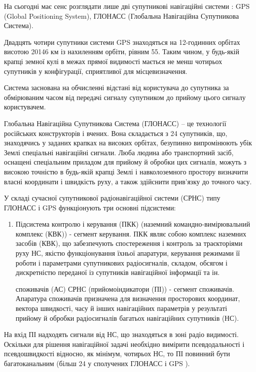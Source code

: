 На сьогодні має сенс розглядати лише дві супутникові навігаційні системи : GPS (Global Positioning System), 
ГЛОНАСС (Глобальна Навігаційна Супутникова Система).

Двадцять чотири супутники системи GPS знаходяться на 12-годинних орбітах висотою 
20146 км із нахиленням орбіти, рівним 55. Таким чином, 
у будь-якій крапці земної кулі в межах прямої видимості мається не менш чотирьох супутників 
у конфігурації, сприятливої для місцевизначення.

Система заснована на обчисленні відстані від користувача до супутника за обмірюваним часом 
від передачі сигналу супутником до прийому цього сигналу користувачем.

Глобальна Навігаційна Супутникова Система (ГЛОНАСС) -- це технології російських конструкторів і вчених.
Вона складається 
з 24 супутників, що, знаходячись у заданих крапках на високих орбітах, безупинно випромінюють 
убік Землі спеціальні навігаційні сигнали. Люба людина або транспортний засіб, оснащені 
спеціальним приладом для прийому й обробки цих сигналів, можуть з високою точністю в 
будь-якій крапці Землі і навколоземного простору визначити власні координати і швидкість 
руху, а також здійснити прив'язку до точного часу.

У складі сучасної супутникової радіонавігаційної системи (СРНС) типу ГЛОНАСС і 
GPS функціонують три основні підсистеми:

\begin{enumerate}

 космічних апаратів (ПКА), що складається з навігаційних супутників (НС) 
(мережа навігаційних супутників - космічний сегмент). ПКА СРНС складається з визначеного 
числа навігаційних супутників. Основні функції НС --- формування і випромінювання 
радіосигналів, необхідних для навігаційних визначень споживачів СРНС, контролю бортових 
систем супутника підсистемою контролю і керування СРНС. Відповідні характеристики сигналів 
НС і способи їхньої обробки дозволяють проводити навігаційні виміри з високою точністю.

 \item Підсистема контролю і керування (ПКК) (наземний командно-вимірювальний комплекс (КВК)) - 
сегмент керування. ПКК являє собою комплекс наземних засобів (КВК), що забезпечують 
спостереження і контроль за траєкторіями руху НС, якістю функціонування їхньої апаратури, 
керування режимами її роботи і параметрами супутникових радіосигналів, складом, обсягом і 
дискретністю переданої із супутників навігаційної інформації та ін.

  споживачів (АС) СРНС (прийомоіндикатори (ПІ)) - сегмент споживачів.
Апаратура споживачів призначена для визначення просторових координат, вектора швидкості, 
часу й інших навігаційних параметрів у результаті прийому й обробки радіосигналів багатьох 
навігаційних супутників (НС).

\end{enumerate}
На вхід ПІ надходять сигнали від НС, що знаходяться в зоні радіо видимості. Оскільки для 
рішення навігаційної задачі необхідно вимірити псевдодальності і псевдошвидкості відносно, 
як мінімум, чотирьох НС, то ПІ повинний бути багатоканальним (більш 24 у сполучених ГЛОНАСС і GPS ).

